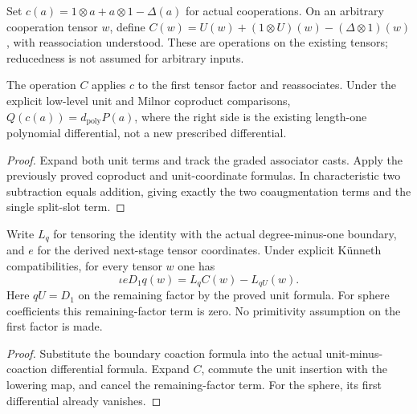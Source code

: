 \begin{definition}
  \label{def:h6-actual-cobar-split}
  \leanok
  Set $c(a)=1\otimes a+a\otimes1-\Delta(a)$ for actual cooperations.
  On an arbitrary cooperation tensor $w$, define
  $C(w)=U(w)+(1\otimes U)(w)-(\Delta\otimes1)(w)$, with reassociation
  understood. These are operations on the existing tensors; reducedness
  is not assumed for arbitrary inputs.
\end{definition}

\begin{proposition}
  \label{prop:h6-actual-cobar-split}
  \leanok
  The operation $C$ applies $c$ to the first tensor factor and reassociates.
  Under the explicit low-level unit and Milnor coproduct comparisons,
  $Q(c(a))=d_{\mathrm{poly}}P(a)$, where the right side is the existing
  length-one polynomial differential, not a new prescribed differential.
\end{proposition}
\begin{proof}
  Expand both unit terms and track the graded associator casts. Apply
  the previously proved coproduct and unit-coordinate formulas. In
  characteristic two subtraction equals addition, giving exactly the
  two coaugmentation terms and the single split-slot term.
  \leanok
\end{proof}

\begin{proposition}
  \label{prop:h6-actual-cobar-recurrence}
  \leanok
  Write $L_q$ for tensoring the identity with the actual degree-minus-one
  boundary, and $e$ for the derived next-stage tensor coordinates.
  Under explicit K\"unneth compatibilities, for every tensor $w$ one has
  \[
    \iota e D_1 q(w)=L_q C(w)-L_{qU}(w).
  \]
  Here $qU=D_1$ on the remaining factor by the proved unit formula.
  For sphere coefficients this remaining-factor term is zero. No
  primitivity assumption on the first factor is made.
\end{proposition}
\begin{proof}
  Substitute the boundary coaction formula into the actual
  unit-minus-coaction differential formula. Expand $C$, commute the
  unit insertion with the lowering map, and cancel the remaining-factor
  term. For the sphere, its first differential already vanishes.
  \leanok
\end{proof}

